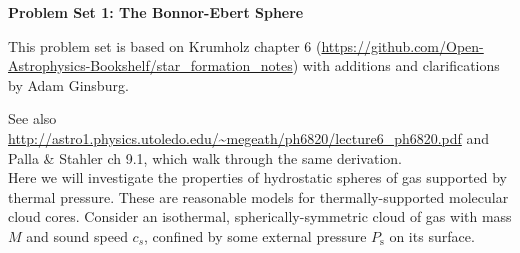 \documentclass{article}
\begin{document}
\noindent\textbf{Problem Set 1: The Bonnor-Ebert Sphere}

This problem set is based on Krumholz chapter 6
(\url{https://github.com/Open-Astrophysics-Bookshelf/star_formation_notes})
with additions and clarifications by Adam Ginsburg.

See also
\url{http://astro1.physics.utoledo.edu/~megeath/ph6820/lecture6_ph6820.pdf} and
Palla \& Stahler ch 9.1,
which walk through the same derivation.   
\\

Here we will investigate the properties of hydrostatic spheres of gas supported
by thermal pressure. These are reasonable models for thermally-supported
molecular cloud cores. Consider an isothermal, spherically-symmetric cloud of
gas with mass $M$ and sound speed $c_s$, confined by some external pressure
$P_{\mathrm{s}}$ on its surface.
\end{document}
